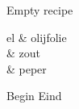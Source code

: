 \begin{recipe}
[ %
    preparationtime = {\unit[45]{min}},
    portion = {\portion{4}},
]
{Empty recipe}

    \ingredients
    {%
        \unit[1]{el} & olijfolie \\
	    & zout \\
        & peper \\
    }

    \preparation
    {%
	    \step Begin
	    \step Eind
    }
    
\end{recipe}

